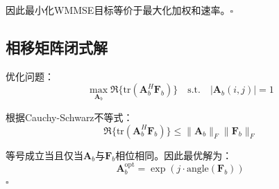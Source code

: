 \documentclass[10pt,twocolumn]{IEEEtran}
\newcommand{\mat}[1]{\mathbf{#1}}
\begin{document}
因此最小化WMMSE目标等价于最大化加权和速率。$\square$

\subsection{相移矩阵闭式解}

优化问题：
\begin{equation}
\max_{\mat{A}_b} \Re\{\text{tr}(\mat{A}_b^H \mat{F}_b)\} \quad \text{s.t.} \quad |\mat{A}_b(i,j)| = 1
\end{equation}

根据Cauchy-Schwarz不等式：
\begin{equation}
\Re\{\text{tr}(\mat{A}_b^H \mat{F}_b)\} \leq \|\mat{A}_b\|_F \|\mat{F}_b\|_F
\end{equation}

等号成立当且仅当$\mat{A}_b$与$\mat{F}_b$相位相同。因此最优解为：
\begin{equation}
\mat{A}_b^{\text{opt}} = \exp(j \cdot \text{angle}(\mat{F}_b))
\end{equation}
$\square$
\end{document}
